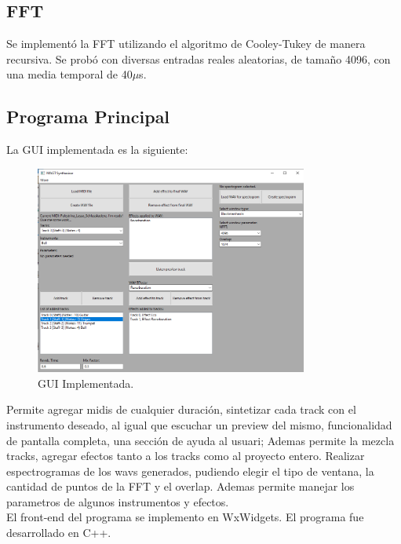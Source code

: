 


\subsection{FFT}
Se implementó la FFT utilizando el algoritmo de Cooley-Tukey de manera recursiva.
Se probó con diversas entradas reales aleatorias, de tamaño 4096, con una media temporal de 40$\mu$s.
\subsection{Programa Principal}
La GUI implementada es la siguiente:
\begin{figure}[H]
	\centering
	\includegraphics[width=0.8\textwidth]{ImagenesEjercicio8/GUI.PNG}
\caption{GUI Implementada.}
	\label{fig:gui}
\end{figure}
Permite agregar midis de cualquier duración, sintetizar cada track con el instrumento deseado, al igual que escuchar un preview del mismo, funcionalidad de pantalla completa, una sección de ayuda al usuari; Ademas permite la mezcla tracks, agregar efectos tanto a los tracks como al proyecto entero. Realizar espectrogramas de los wavs generados, pudiendo elegir el tipo de ventana, la cantidad de puntos de la FFT y el overlap. Ademas permite manejar los parametros de algunos instrumentos y efectos.\\
El front-end del programa se implemento en WxWidgets. El programa fue desarrollado en C++. \\

